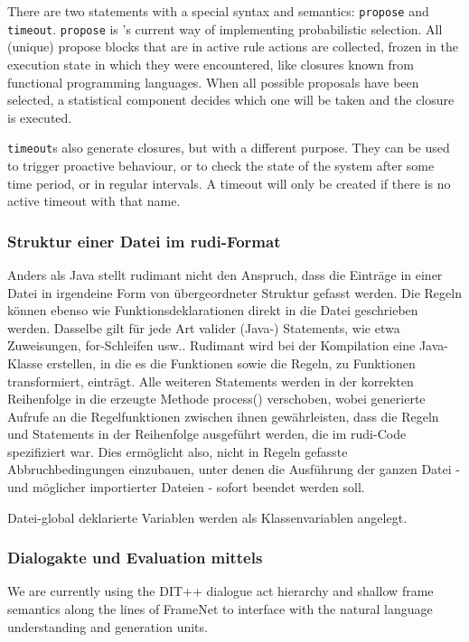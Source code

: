 There are two statements with a special syntax and semantics: \texttt{propose}
and \texttt{timeout}. \texttt{propose} is \vonda's current way of implementing
probabilistic selection. All (unique) propose blocks that are in active rule
actions are collected, frozen in the execution state in which they were
encountered, like closures known from functional programming languages. When
all possible proposals have been selected, a statistical component decides
which one will be taken and the closure is executed.

\texttt{timeout}s also generate closures, but with a different purpose. They
can be used to trigger proactive behaviour, or to check the state of the system
after some time period, or in regular intervals. A timeout will only be created
if there is no active timeout with that name.

\subsubsection{Struktur einer Datei im rudi-Format}

Anders als Java stellt rudimant nicht den Anspruch, dass die Einträge in einer
Datei in irgendeine Form von übergeordneter Struktur gefasst werden. Die Regeln
können ebenso wie Funktionsdeklarationen direkt in die Datei geschrieben
werden. Dasselbe gilt für jede Art valider (Java-) Statements, wie etwa
Zuweisungen, for-Schleifen usw.. Rudimant wird bei der Kompilation eine
Java-Klasse erstellen, in die es die Funktionen sowie die Regeln, zu Funktionen
transformiert, einträgt. Alle weiteren Statements werden in der korrekten
Reihenfolge in die erzeugte Methode process() verschoben, wobei generierte
Aufrufe an die Regelfunktionen zwischen ihnen gewährleisten, dass die Regeln
und Statements in der Reihenfolge ausgeführt werden, die im rudi-Code
spezifiziert war. Dies ermöglicht also, nicht in Regeln gefasste
Abbruchbedingungen einzubauen, unter denen die Ausführung der ganzen Datei -
und möglicher importierter Dateien - sofort beendet werden soll.

Datei-global deklarierte Variablen werden als Klassenvariablen angelegt.

\subsubsection{Dialogakte und Evaluation mittels \caret}
\label{sec:caret}

We are currently using the DIT++ dialogue act hierarchy \citep{bunt2012iso} and
shallow frame semantics along the lines of FrameNet
\citep{ruppenhofer2016framenet} to interface with the natural language
understanding and generation units.

